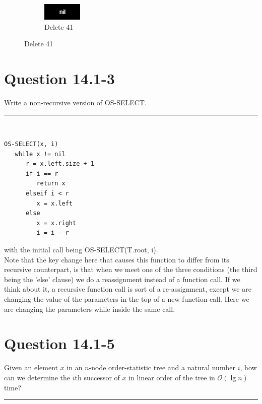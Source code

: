 \documentclass[20pt]{article} %
\begin{document}
\begin{figure}[!htbp]
  	\begin{subfigure}[p]{0.4\linewidth}
    	\includegraphics[width=\linewidth]{a7.jpg}
    	\caption{Delete 41}
  	\end{subfigure}

\end{figure}

\newpage
\newpage
\newpage
\newpage
\section{Question 14.1-3}
Write a non-recursive version of OS-SELECT. \\
\noindent\rule{2cm}{0.4pt} \\

\begin{verbatim}
OS-SELECT(x, i)
   while x != nil
      r = x.left.size + 1
      if i == r
         return x
      elseif i < r
         x = x.left
      else 
         x = x.right
         i = i - r
\end{verbatim}

with the initial call being OS-SELECT(T.root, i). \\ 
Note that the key change here that causes this function to differ from its recursive counterpart, is that when we meet one of the three conditions (the third being the 'else' clause) we do a reassignment instead of a function call.  If we think about it, a recursive function call is sort of a re-assignment, except we are changing the value of the parameters in the top of a new function call.  Here we are changing the parameters while inside the same call.



\section{Question 14.1-5}
Given an element $x$ in an $n$-node order-statistic tree and a natural number $i$, how can we determine the $i$th successor of $x$ in linear order of the tree in $\mathcal{O}(\lg n)$ time? \\
\noindent\rule{2cm}{0.4pt} \\
\end{document}
